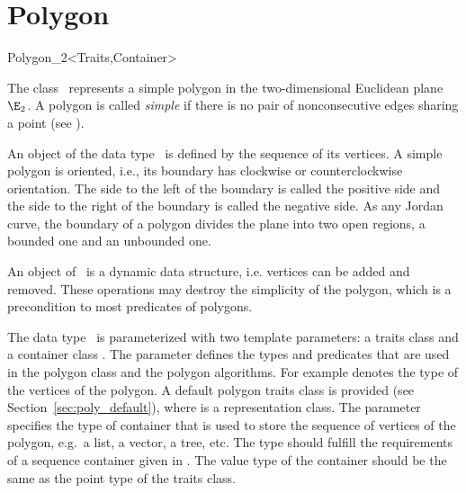 
\cleardoublepage
\chapter{Polygon}\label{Polygon}

\begin{ccClassTemplate}{Polygon_2<Traits,Container>}

\ccDefinition

The class \ccClassName\ represents a simple polygon in the two-dimensional
Euclidean plane $\E_2$. A polygon is called {\em simple} if there is no pair
of nonconsecutive edges sharing a point (see \cite{ps-cgi-85}).

An object  of the data type \ccClassName\ is defined by the sequence
of its vertices. A simple polygon  is oriented, i.e., its boundary has
clockwise or counterclockwise orientation. The side to the left of the boundary
is called the positive side and the side to the right of the boundary is called
the negative side.  As any Jordan curve, the boundary of a polygon divides the
plane into two open regions, a bounded one and an unbounded one.

An object  of \ccClassName\ is a dynamic data
structure, i.e. vertices can be added and removed. These operations may
destroy the simplicity of the polygon, which is a precondition to most
predicates of polygons.

The data type \ccClassName\ is parameterized with two template parameters: 
a traits class  and a container class . 
The parameter  defines the types and predicates
that are used in the polygon class and the polygon algorithms.
For example  denotes the type of the vertices
of the polygon. 
A default polygon traits class  is provided 
(see Section~\ref{sec:poly_default}), where  is a representation 
class.
The parameter  specifies the type of container that is 
used to store the sequence of vertices of the polygon, e.g.\ a list, a vector, 
a tree, etc.
The type  should fulfill the requirements of a sequence 
container given in \cite{ms-strg-96}. 
The value type of the container should be the same as the point type of the 
traits class.



\end{ccClassTemplate}
